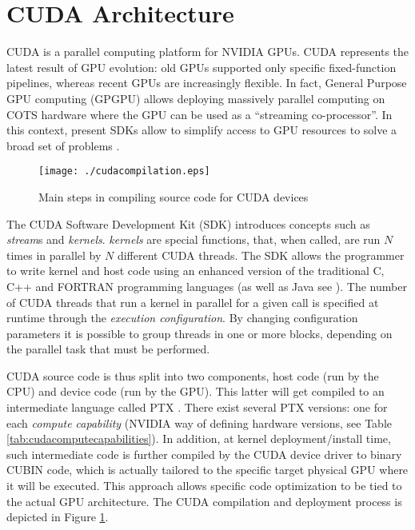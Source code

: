 \documentclass[11pt,onecolumn,letterpaper]{IEEEtran}
\begin{document}
\section{CUDA Architecture}
\label{cuda}
CUDA is a parallel computing platform for NVIDIA GPUs. 
CUDA represents the latest result of GPU evolution: old GPUs supported only specific fixed-function pipelines, whereas recent GPUs are 
increasingly flexible.
In fact, General Purpose GPU computing (GPGPU) \cite{gpgpu2} allows deploying massively parallel computing on COTS hardware
where the GPU can be used as a ``streaming co-processor''. 
In this context, present SDKs allow to simplify access to GPU resources to solve a broad set of problems \cite{gpgpu}. 

\begin{figure}[t]
 \centering
 \texttt{[image: ./cudacompilation.eps]}
 \caption{Main steps in compiling source code for CUDA devices}
 \label{fig:CUDA_Compiling}
\end{figure}

The CUDA Software Development Kit (SDK) introduces concepts such as \emph{stream}s and \emph{kernels}.
\emph{kernels} are special functions, that, when called, are run $N$ times in parallel by $N$ different CUDA threads. 
The SDK allows the programmer to write kernel and host code using an enhanced version of the traditional C, C++ and FORTRAN programming languages (as well as Java see \cite{jcuda}).
The number of CUDA threads that run a kernel in parallel for a given call is specified at runtime through the \emph{execution configuration}. 
By changing configuration parameters it is possible to group threads in one or more blocks, depending on the parallel task that must be performed.

CUDA source code is thus split into two components, host code (run by the CPU) and device code (run by the GPU).
This latter will get compiled to an intermediate language called PTX \cite{cudadevguide}.
There exist several PTX versions: one for each \textit{compute capability} (NVIDIA way of defining hardware versions, see Table \ref{tab:cudacomputecapabilities}).
In addition, at kernel deployment/install time, such intermediate code is further compiled by the CUDA device driver to binary CUBIN code,
which is actually tailored to the specific target physical GPU where it will be executed.
This approach allows specific code optimization to be tied to the actual GPU architecture. The CUDA compilation and deployment process is depicted in Figure \ref{fig:CUDA_Compiling}.
\end{document}
